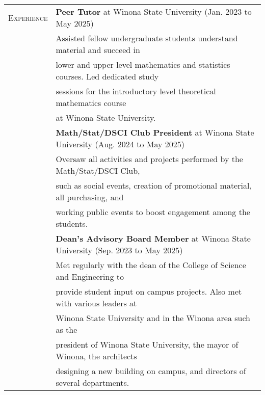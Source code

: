 \documentclass{article}
\begin{document}
\begin{tabular}{l l}
\textsc{Experience} & \textbf{Peer Tutor} at Winona State University (Jan. 2023 to May 2025)\\
					& \hspace{5mm} Assisted fellow undergraduate students understand material and succeed in \\
					& \hspace{2.5mm}lower and upper level mathematics and statistics courses. Led dedicated study\\ 
					& \hspace{2.5mm}sessions for the introductory level theoretical mathematics course \\
					& \hspace{2.5mm}at Winona State University.\\
					
					& \textbf{Math/Stat/DSCI Club President} at Winona State University (Aug. 2024 to May 2025)\\
					& \hspace{5mm} Oversaw all activities and projects performed by the Math/Stat/DSCI Club, \\
					& \hspace{2.5mm} such as social events, creation of promotional material, all purchasing, and\\
					& \hspace{2.5mm} working public events to boost engagement among the students. \\
					
					& \textbf{Dean's Advisory Board Member} at Winona State University (Sep. 2023 to May 2025) \\
					& \hspace{5mm} Met regularly with the dean of the College of Science and Engineering to \\
					& \hspace{2.5mm} provide student input on campus projects. Also met with various leaders at \\
					& \hspace{2.5mm} Winona State University and in the Winona area such as the \\
					& \hspace{2.5mm} president of Winona State University, the mayor of Winona, the architects \\
					& \hspace{2.5mm} designing a new building on campus, and directors of several departments. \\
\end{tabular}
\end{document}
